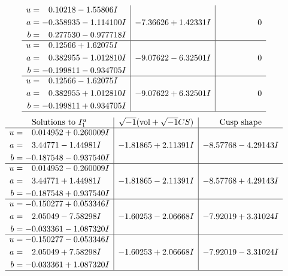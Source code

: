 \documentclass[1p]{elsarticle_modified}
\theoremstyle{definition}
\newcommand{\I}{\sqrt{-1}}
\begin{document}
$$\begin{array}{c|c|c}
\begin{aligned}
u &= \phantom{-}0.10218 - 1.55806 I \\
a &= -0.358935 - 1.114100 I \\
b &= \phantom{-}0.277530 - 0.977718 I\end{aligned}
 & -7.36626 + 1.42331 I & \phantom{-0.000000 } 0 \\ \hline\begin{aligned}
u &= \phantom{-}0.12566 + 1.62075 I \\
a &= \phantom{-}0.382955 - 1.012810 I \\
b &= -0.199811 - 0.934705 I\end{aligned}
 & -9.07622 - 6.32501 I & \phantom{-0.000000 } 0 \\ \hline\begin{aligned}
u &= \phantom{-}0.12566 - 1.62075 I \\
a &= \phantom{-}0.382955 + 1.012810 I \\
b &= -0.199811 + 0.934705 I\end{aligned}
 & -9.07622 + 6.32501 I & \phantom{-0.000000 } 0\\
 \hline 
 \end{array}$$\newpage$$\begin{array}{c|c|c}  
\text{Solutions to }I^u_{1}& \I (\text{vol} + \sqrt{-1}CS) & \text{Cusp shape}\\
 \hline 
\begin{aligned}
u &= \phantom{-}0.014952 + 0.260009 I \\
a &= \phantom{-}3.44771 - 1.44981 I \\
b &= -0.187548 - 0.937540 I\end{aligned}
 & -1.81865 + 2.11391 I & -8.57768 - 4.29143 I \\ \hline\begin{aligned}
u &= \phantom{-}0.014952 - 0.260009 I \\
a &= \phantom{-}3.44771 + 1.44981 I \\
b &= -0.187548 + 0.937540 I\end{aligned}
 & -1.81865 - 2.11391 I & -8.57768 + 4.29143 I \\ \hline\begin{aligned}
u &= -0.150277 + 0.053346 I \\
a &= \phantom{-}2.05049 - 7.58298 I \\
b &= -0.033361 - 1.087320 I\end{aligned}
 & -1.60253 - 2.06668 I & -7.92019 + 3.31024 I \\ \hline\begin{aligned}
u &= -0.150277 - 0.053346 I \\
a &= \phantom{-}2.05049 + 7.58298 I \\
b &= -0.033361 + 1.087320 I\end{aligned}
 & -1.60253 + 2.06668 I & -7.92019 - 3.31024 I\\
 \hline 
 \end{array}$$\newpage\newpage\renewcommand{\arraystretch}{1}
\end{document}
